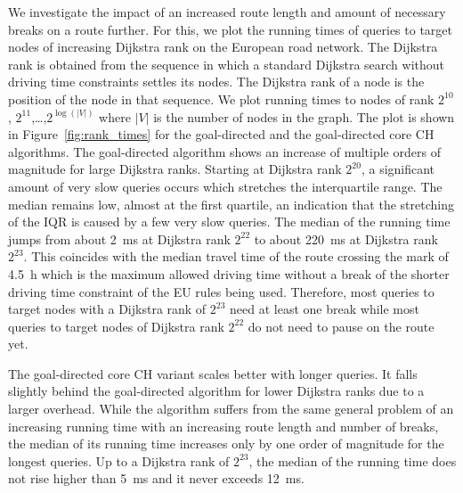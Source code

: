We investigate the impact of an increased route length and amount of necessary breaks on a route further. For this, we plot the running times of queries to target nodes of increasing Dijkstra rank on the European road network. The Dijkstra rank is obtained from the sequence in which a standard Dijkstra search without driving time constraints settles its nodes. The Dijkstra rank of a node is the position of the node in that sequence. We plot running times to nodes of rank $2^{10}$, $2^{11}$,\dots,$2^{\log(|V|)}$ where $|V|$ is the number of nodes in the graph. The plot is shown in Figure~\ref{fig:rank_times} for the goal-directed and the goal-directed core CH algorithms. The goal-directed algorithm shows an increase of multiple orders of magnitude for large Dijkstra ranks. Starting at Dijkstra rank $2^{20}$, a significant amount of very slow queries occurs which stretches the interquartile range. The median remains low, almost at the first quartile, an indication that the stretching of the IQR is caused by a few very slow queries. The median of the running time jumps from about \SI{2}{\milli\second} at Dijkstra rank $2^{22}$ to about \SI{220}{\milli\second} at Dijkstra rank $2^{23}$. This coincides with the median travel time of the route crossing the mark of \SI{4.5}{\hour} which is the maximum allowed driving time without a break of the shorter driving time constraint of the EU rules being used. Therefore, most queries to target nodes with a Dijkstra rank of $2^{23}$ need at least one break while most queries to target nodes of Dijkstra rank  $2^{22}$ do not need to pause on the route yet.

The goal-directed core CH variant scales better with longer queries. It falls slightly behind the goal-directed algorithm for lower Dijkstra ranks due to a larger overhead. While the algorithm suffers from the same general problem of an increasing running time with an increasing route length and number of breaks, the median of its running time increases only by one order of magnitude for the longest queries. Up to a Dijkstra rank of $2^{23}$, the median of the running time does not rise higher than \SI{5}{\milli\second} and it never exceeds \SI{12}{\milli\second}.


